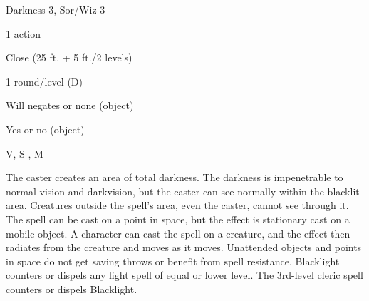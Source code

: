 
\begin{description*}
\item[Level:] Darkness 3, Sor/Wiz 3
\item[Casting Time:] 1 action
\item[Range:] Close (25 ft. + 5 ft./2 levels)
\item[Duration:] 1 round/level (D)
\item[Saving Throw:] Will negates or none (object)
\item[Spell Resistance:] Yes or no (object)
\item[Components:] V, S , M
\end{description*}

The caster creates an area of total darkness. The darkness is impenetrable to normal
vision and darkvision, but the caster can see normally within the blacklit area.
Creatures outside the spell's area, even the caster, cannot see through it.
The spell can be cast on a point in space, but the effect is stationary cast on
a mobile object. A character can cast the spell on a creature, and the effect then
radiates from the creature and moves as it moves. Unattended objects and points
in space do not get saving throws or benefit from spell resistance.
Blacklight counters or dispels any light spell of equal or lower level.
The 3rd-level cleric spell  counters or dispels Blacklight.